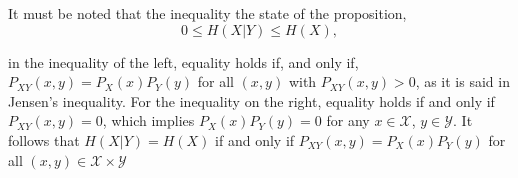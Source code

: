 It must be noted that the inequality the state of the proposition,
$$
0 \leq H(X|Y) \leq H(X),
$$

in the inequality of the left, equality holds if, and only if, $P_{XY}(x,y) = P_X(x) P_Y(y)$ for all $(x,y)$ with $P_{XY} (x,y) > 0$, as it is said in Jensen's inequality.
For the inequality on the right, equality holds if and only if $P_{XY}(x,y) = 0$, which implies $P_X(x)P_Y(y) = 0$ for any $x\in \mathcal X$, $y \in \mathcal Y$. It follows that $H(X|Y) = H(X)$ if and only if $P_{XY}(x,y) = P_X(x)P_Y(y)$ for all $(x,y) \in \mathcal X \times \mathcal Y$

